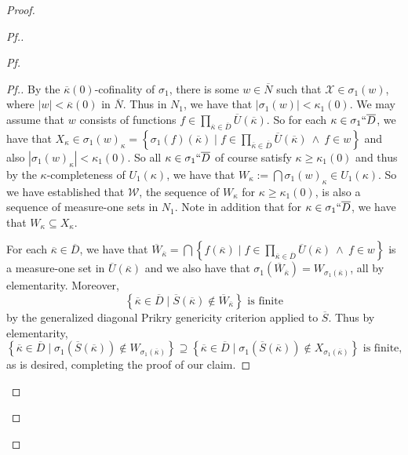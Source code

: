 \documentclass{amsart}
\theoremstyle{definition}
\theoremstyle{remark}
\newcommand{\N}{{\overline{N}}}
\renewcommand{\S}{{\overline{S}}}
\newcommand{\st}{\; | \;}
\newcommand{\set}[2]{\left\{#1\st #2 \right\}}
\begin{document}
\begin{proof}
\begin{proof}[Pf.]
\begin{proof}[Pf]
\begin{proof}[Pf.]
By the $\overline{\kappa}(0)$-cofinality of $\sigma_1$, there is some $w \in \N$ such that $\mathcal X \in \sigma_1(w)$, where $|w| < \overline{\kappa}(0)$ in $\N$. Thus in $N_1$, we have that $|\sigma_1(w)| < \kappa_1(0)$. 
We may assume that $w$ consists of functions $f \in \prod_{\overline \kappa \in \overline D} \overline U(\overline \kappa)$.
So for each $\kappa \in \sigma_1``\overline D$, we have that $X_\kappa \in \sigma_1(w)_\kappa =
\set{\sigma_1(f)(\overline \kappa) }{ f \in \prod_{\overline \kappa \in \overline D} \overline U(\overline \kappa) \ \land \ f \in w }$ and also $|\sigma_1(w)_\kappa|<\kappa_1(0).$ So all $\kappa \in \sigma_1``\overline D$ of course satisfy $\kappa \geq \kappa_1(0)$ and thus by the $\kappa$-completeness of $U_1(\kappa)$, we have that $W_\kappa := \bigcap \sigma_1(w)_\kappa \in  U_1(\kappa).$
So we have established that $\mathcal W$, the sequence of $W_\kappa$ for $\kappa \geq \kappa_1(0)$, is also a sequence of measure-one sets in $N_1$. Note in addition that for $\kappa \in \sigma_1``\overline D$, we have that $W_\kappa \subseteq X_\kappa$. 

For each $\overline \kappa \in \overline D$, we have that $\overline W_{\overline \kappa} = \bigcap \set{f(\overline \kappa) }{ f \in \prod_{\overline \kappa \in \overline D} \overline U(\overline \kappa) \ \land \ f \in w }$ is a measure-one set in $\overline U(\overline \kappa)$ and we also have that $\sigma_1(\overline W_{\overline \kappa}) = W_{\sigma_1(\overline \kappa)}$, all by elementarity. Moreover, 
$$\set{\overline \kappa \in \overline D}{\overline S(\overline \kappa) \notin \overline W_{\overline \kappa}} \text{ is finite}$$ by the generalized diagonal Prikry genericity criterion applied to $\overline S$.
Thus by elementarity,
$$\set{ \overline \kappa \in \overline D }{ \sigma_1(\S(\overline \kappa)) \notin W_{\sigma_1(\overline \kappa)} } \supseteq \set{ \overline \kappa \in \overline D }{ \sigma_1(\S(\overline \kappa)) \notin X_{\sigma_1(\overline \kappa)}} \text{ is finite,}$$
as is desired, completing the proof of our claim.
\end{proof}







\end{proof}
\end{proof}
\end{proof}
\end{document}
